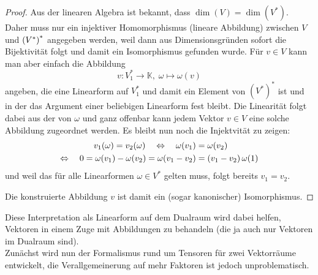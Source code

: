 \documentclass[../H_Analysis_main.tex]{subfiles}
\begin{document}
\begin{proof}
Aus der linearen Algebra ist bekannt, dass $\dim(V) = \dim(V^*)$. Daher muss nur ein injektiver Homomorphismus (lineare Abbildung) zwischen $V$ und $\qty(V^*)^*$ angegeben werden, weil dann aus Dimensionsgründen sofort die Bijektivität folgt und damit ein Isomorphismus gefunden wurde. Für $v \in V$ kann man aber einfach die Abbildung
\begin{equation*}
v: V^*_1 \rightarrow \mathbb{K}, \; \omega \mapsto \omega(v)
\end{equation*}
angeben, die eine Linearform auf $V^*_1$ und damit ein Element von $(V^*)^*$ ist und in der das Argument einer beliebigen Linearform fest bleibt. Die Linearität folgt dabei aus der von $\omega$ und ganz offenbar kann jedem Vektor $v \in V$ eine solche Abbildung zugeordnet werden. Es bleibt nun noch die Injektvität zu zeigen:
\begin{align*}
v_1(\omega) = v_2(\omega) \quad \Leftrightarrow \quad \omega(v_1) &= \omega(v_2)
\\
\Leftrightarrow \quad 0 = \omega(v_1) - \omega(v_2) = \omega(v_1 - v_2) &= \qty(v_1 - v_2) \, \omega(1)
\end{align*}
und weil das für alle Linearformen $\omega \in V^*$ gelten muss, folgt bereits $v_1 = v_2$.

Die konstruierte Abbildung $v$ ist damit ein (sogar kanonischer) Isomorphismus.
\end{proof}

Diese Interpretation als Linearform auf dem Dualraum wird dabei helfen, Vektoren in einem Zuge mit Abbildungen zu behandeln (die ja auch nur Vektoren im Dualraum sind).\\

Zunächst wird nun der Formalismus rund um Tensoren für zwei Vektorräume entwickelt, die Verallgemeinerung auf mehr Faktoren ist jedoch unproblematisch.
\end{document}
